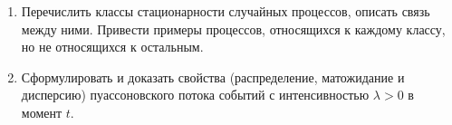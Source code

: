 \documentclass[a4paper,12pt]{extreport}
\renewcommand{\=}[1]{\stackrel{#1}{=}} %
\begin{document}
\begin{enumerate}








    \item Перечислить классы стационарности случайных процессов,
    описать связь между ними.
    Привести примеры процессов, относящихся к каждому классу,
    но не относящихся к остальным.

    \item Сформулировать и доказать свойства
    (распределение, матожидание и дисперсию) пуассоновского
    потока событий с интенсивностью $\lambda > 0$ в момент $t$.



\end{enumerate}
\end{document}
